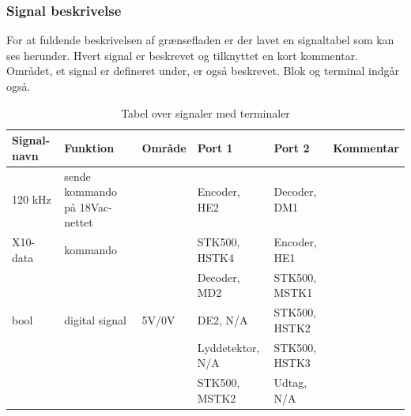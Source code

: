 \begin{table}[htbp]
\subsubsection{Signal beskrivelse}
For at fuldende beskrivelsen af grænsefladen er der lavet en signaltabel som kan ses herunder. Hvert signal er beskrevet og tilknyttet en kort kommentar. Området, et signal er defineret under, er også beskrevet. Blok og terminal indgår også. 
\caption{Tabel over signaler med terminaler}
\begin{small}
\begin{tabular}{|p{2cm}|p{2cm}|p{2cm}|p{2cm}|p{2cm}|p{}|}
\hline
\textbf{Signal-navn} & \textbf{Funktion} & \textbf{Område} & \textbf{Port 1} & \textbf{Port 2} & \textbf{Kommentar} \\ \hline

120 kHz & sende kommando på 18Vac-nettet & & Encoder, HE2 & Decoder, DM1 & \\ \hline

X10-data & kommando & & STK500, HSTK4 & Encoder, HE1 & \\ \cline{4-5}
&&& Decoder, MD2 & STK500, MSTK1 &\\ \hline

bool & digital signal & 5V/0V & DE2, N/A & STK500, HSTK2 & \\ \cline{4-5}
&&& Lyddetektor, N/A & STK500, HSTK3 & \\ \cline{4-5}
&&& STK500, MSTK2 & Udtag, N/A & \\ \hline
\end{tabular}
\end{small}
\label{table:Signaltabel}
\end{table}


